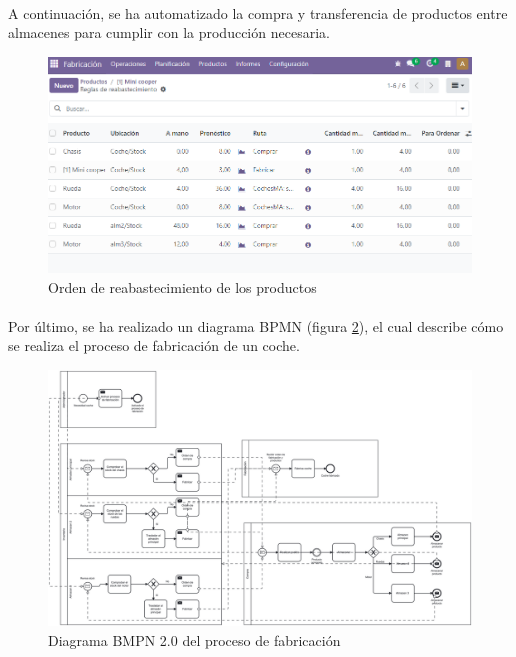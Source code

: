 \paragraph{}
A continuación, se ha automatizado la compra y transferencia de productos entre almacenes para cumplir con la producción necesaria.
\begin{figure}[h]
    \centering
    \includegraphics[width=1\linewidth]{fotosGestFab/reabastecimiento.png}
    \caption{Orden de reabastecimiento de los productos}
    \label{fig:enter-label}
\end{figure}
\newpage
\paragraph{}
Por último, se ha realizado un diagrama BPMN (figura \ref{fab}), el cual describe cómo se realiza el proceso de fabricación de un coche.
\begin{figure}[h]
    \centering
    \includegraphics[width=1\linewidth]{fotosGestFab/Fabricacion.png}
    \caption{Diagrama BMPN 2.0 del proceso de fabricación}
    \label{fab}
\end{figure}
